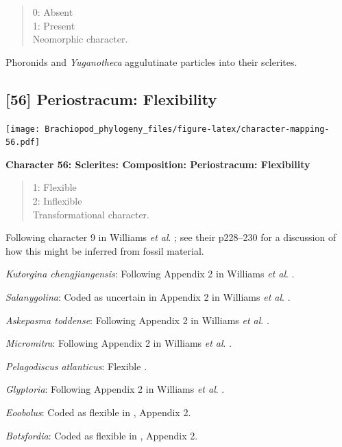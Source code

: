 \documentclass[]{book}
\theoremstyle{definition}
\theoremstyle{definition}
\theoremstyle{definition}
\theoremstyle{remark}
\begin{document}
\begin{quote}
0: Absent\\
1: Present\\
Neomorphic character.
\end{quote}

Phoronids and \emph{Yuganotheca} aggulutinate particles into their
sclerites.

\hypertarget{periostracum-flexibility}{%
\subsection*{{[}56{]} Periostracum:
Flexibility}\label{periostracum-flexibility}}

\texttt{[image: Brachiopod\_phylogeny\_files/figure-latex/character-mapping-56.pdf]}

\textbf{Character 56: Sclerites: Composition: Periostracum: Flexibility}

\begin{quote}
1: Flexible\\
2: Inflexible\\
Transformational character.
\end{quote}

Following character 9 in Williams \emph{et al}.
\citeyearpar{Williams1998Thediversity}; see their p228--230 for a
discussion of how this might be inferred from fossil material.

\emph{Kutorgina chengjiangensis}: Following Appendix 2 in Williams
\emph{et al}. \citeyearpar{Williams1998Thediversity}.

\emph{Salanygolina}: Coded as uncertain in Appendix 2 in Williams
\emph{et al}. \citeyearpar{Williams1998Thediversity}.

\emph{Askepasma toddense}: Following Appendix 2 in Williams \emph{et
al}. \citeyearpar{Williams1998Thediversity}.

\emph{Micromitra}: Following Appendix 2 in Williams \emph{et al}.
\citeyearpar{Williams1998Thediversity}.

\emph{Pelagodiscus atlanticus}: Flexible
\citep{Williams1998Thediversity}.

\emph{Glyptoria}: Following Appendix 2 in Williams \emph{et al}.
\citeyearpar{Williams1998Thediversity}.

\emph{Eoobolus}: Coded as flexible in \citet{Williams1998Thediversity},
Appendix 2.

\emph{Botsfordia}: Coded as flexible in
\citet{Williams1998Thediversity}, Appendix 2.
\end{document}
